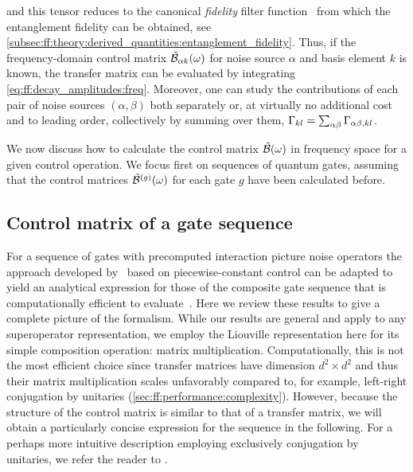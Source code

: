 and this tensor reduces to the canonical \emph{fidelity} filter function~\cite{Green2012} from which the entanglement fidelity can be obtained, see \cref{subsec:ff:theory:derived_quantities:entanglement_fidelity}.
Thus, if the frequency-domain control matrix $\tilde{\mathcal{B}}_{\alpha k}(\omega)$ for noise source $\alpha$ and basis element $k$ is known, the transfer matrix can be evaluated by integrating \cref{eq:ff:decay_amplitudes:freq}.
Moreover, one can study the contributions of each pair of noise sources $(\alpha, \beta)$ both separately or, at virtually no additional cost and to leading order, collectively by summing over them, $\Gamma_{kl} = \sum_{\alpha\beta}\Gamma_{\alpha\beta,kl}$.

We now discuss how to calculate the control matrix $\tilde{\mathcal{B}}(\omega)$ in frequency space for a given control operation.
We focus first on sequences of quantum gates, assuming that the control matrices $\tilde{\mathcal{B}}^{(g)}(\omega)$ for each gate $g$ have been calculated before.

\subsection{Control matrix of a gate sequence}\label{subsec:ff:theory:control_matrix:sequence}
For a sequence of gates with precomputed interaction picture noise operators the approach developed by~\citet{Green2013} based on piecewise-constant control can be adapted to yield an analytical expression for those of the composite gate sequence that is computationally efficient to evaluate~\cite{Cerfontaine2021}.
Here we review these results to give a complete picture of the formalism.
While our results are general and apply to any superoperator representation, we employ the Liouville representation here for its simple composition operation: matrix multiplication.
Computationally, this is not the most efficient choice since transfer matrices have dimension $d^2\times d^2$ and thus their matrix multiplication scales unfavorably compared to, for example, left-right conjugation by unitaries (\cf \cref{sec:ff:performance:complexity}).
However, because the structure of the control matrix \ctrlmat is similar to that of a transfer matrix,
we will obtain a particularly concise expression for the sequence in the following.
For a perhaps more intuitive description employing exclusively conjugation by unitaries, we refer the reader to .

